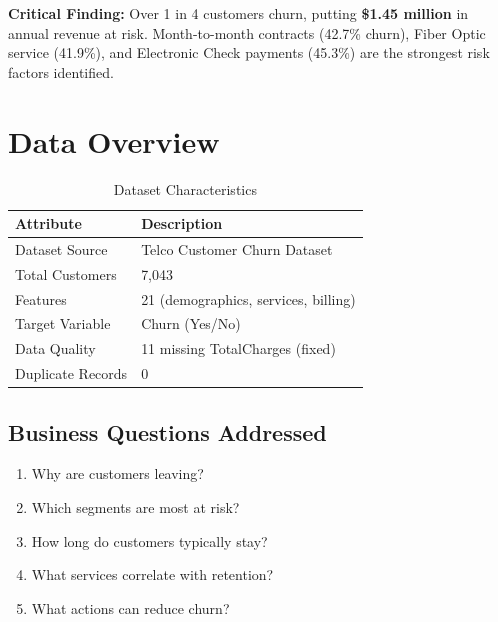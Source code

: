 \documentclass[11pt,a4paper]{article}
\begin{document}
\begin{tcolorbox}[
    colback=churnred!5,
    colframe=churnred!40,
    arc=8pt,
    left=12pt,
    right=12pt
]
\textbf{Critical Finding:} Over 1 in 4 customers churn, putting \textbf{\$1.45 million} in annual revenue at risk. Month-to-month contracts (42.7\% churn), Fiber Optic service (41.9\%), and Electronic Check payments (45.3\%) are the strongest risk factors identified.
\end{tcolorbox}

\section{Data Overview}

\begin{table}[H]
\centering
\begin{tabular}{p{4cm} p{6cm}}
\toprule
\rowcolor{primary!10}
\textbf{Attribute} & \textbf{Description} \\
\midrule
Dataset Source & Telco Customer Churn Dataset \\
Total Customers & 7,043 \\
Features & 21 (demographics, services, billing) \\
Target Variable & Churn (Yes/No) \\
Data Quality & 11 missing TotalCharges (fixed) \\
Duplicate Records & 0 \\
\bottomrule
\end{tabular}
\caption{Dataset Characteristics}
\end{table}

\subsection{Business Questions Addressed}
\begin{enumerate}[label=\color{accent}\textbf{Q\arabic*:}, leftmargin=*]
    \item Why are customers leaving?
    \item Which segments are most at risk?
    \item How long do customers typically stay?
    \item What services correlate with retention?
    \item What actions can reduce churn?
\end{enumerate}
\end{document}
